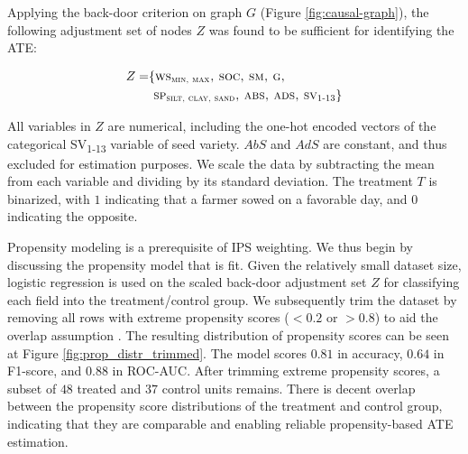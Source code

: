 \documentclass[letterpaper]{article} %
\begin{document}
Applying the back-door criterion on graph $G$ (Figure \ref{fig:causal-graph}), the following adjustment set of nodes $Z$ was found to be sufficient for identifying the ATE:

\begin{equation}
\begin{aligned}
Z = & \{\textsc{ws\textsubscript{min, max}, soc, sm, g, } \\
    & \textsc{  sp\textsubscript{silt, clay, sand}, abs, ads, sv\textsubscript{1-13}} \}
\end{aligned}
\end{equation}

\noindent All variables in $Z$ are numerical, including the one-hot encoded vectors of the categorical \textsc{SV}\textsubscript{1-13} variable of seed variety. $AbS$ and $AdS$ are constant, and thus excluded for estimation purposes. We scale the data by subtracting the mean from each variable and dividing by its standard deviation. The treatment $T$ is binarized, with $1$ indicating that a farmer sowed on a favorable day, and $0$ indicating the opposite.

Propensity modeling is a prerequisite of IPS weighting. We thus begin by discussing the propensity model that is fit. Given the relatively small dataset size,
logistic regression is used on the scaled back-door adjustment set $Z$ for classifying each field into the treatment/control group. We subsequently trim the dataset by removing all rows with extreme propensity scores ($<0.2$ or $>0.8$) to aid the overlap assumption
\cite{imbens2015causal}. The resulting distribution of propensity scores can be seen at Figure \ref{fig:prop_distr_trimmed}. The model scores $0.81$ in accuracy, $0.64$ in F1-score, and $0.88$ in ROC-AUC.
After trimming extreme propensity scores, a subset of $48$ treated and $37$ control units remains. There is decent overlap between the propensity score distributions of the treatment and control group, indicating that they are comparable and enabling reliable propensity-based ATE estimation.
\end{document}
